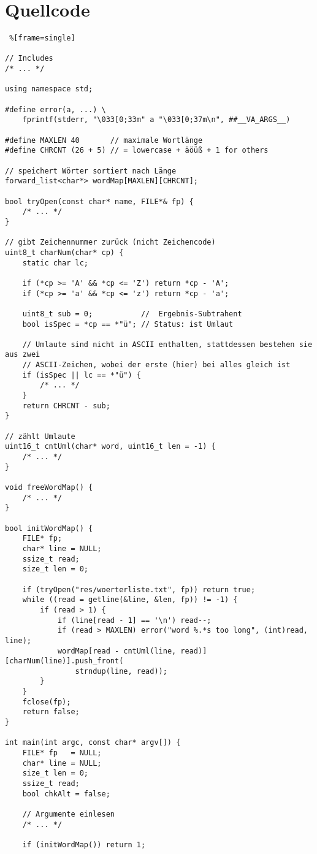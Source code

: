 \documentclass[a4paper,10pt,ngerman]{scrartcl}
\newcommand{\newsection}{\vspace{3\baselineskip}\section}
\begin{document}
\newsection{Quellcode}

\begin{lstlisting} %[frame=single]

// Includes
/* ... */

using namespace std;

#define error(a, ...) \
    fprintf(stderr, "\033[0;33m" a "\033[0;37m\n", ##__VA_ARGS__)

#define MAXLEN 40       // maximale Wortlänge
#define CHRCNT (26 + 5) // = lowercase + äöüß + 1 for others

// speichert Wörter sortiert nach Länge
forward_list<char*> wordMap[MAXLEN][CHRCNT];

bool tryOpen(const char* name, FILE*& fp) {
    /* ... */
}

// gibt Zeichennummer zurück (nicht Zeichencode)
uint8_t charNum(char* cp) {
    static char lc;

    if (*cp >= 'A' && *cp <= 'Z') return *cp - 'A';
    if (*cp >= 'a' && *cp <= 'z') return *cp - 'a';

    uint8_t sub = 0;           //  Ergebnis-Subtrahent
    bool isSpec = *cp == *"ü"; // Status: ist Umlaut

    // Umlaute sind nicht in ASCII enthalten, stattdessen bestehen sie aus zwei
    // ASCII-Zeichen, wobei der erste (hier) bei alles gleich ist
    if (isSpec || lc == *"ü") {
        /* ... */
    }
    return CHRCNT - sub;
}

// zählt Umlaute
uint16_t cntUml(char* word, uint16_t len = -1) {
    /* ... */
}

void freeWordMap() {
    /* ... */
}

bool initWordMap() {
    FILE* fp;
    char* line = NULL;
    ssize_t read;
    size_t len = 0;

    if (tryOpen("res/woerterliste.txt", fp)) return true;
    while ((read = getline(&line, &len, fp)) != -1) {
        if (read > 1) {
            if (line[read - 1] == '\n') read--;
            if (read > MAXLEN) error("word %.*s too long", (int)read, line);
            wordMap[read - cntUml(line, read)][charNum(line)].push_front(
                strndup(line, read));
        }
    }
    fclose(fp);
    return false;
}

int main(int argc, const char* argv[]) {
    FILE* fp   = NULL;
    char* line = NULL;
    size_t len = 0;
    ssize_t read;
    bool chkAlt = false;

    // Argumente einlesen
    /* ... */

    if (initWordMap()) return 1;


\end{lstlisting}
\end{document}
